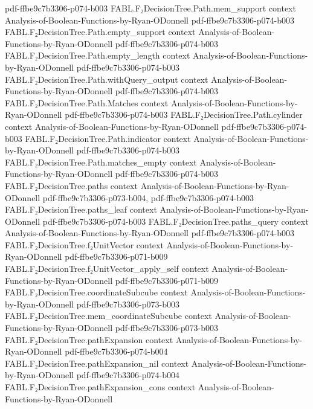 \begin{theorem}
  {pdf-ffbe9c7b3306-p074-b003}
\proofstep
  {FABL.F₂DecisionTree.Path.mem_support}
  {context}
  {Analysis-of-Boolean-Functions-by-Ryan-ODonnell}
  {pdf-ffbe9c7b3306-p074-b003}
\proofstep
  {FABL.F₂DecisionTree.Path.empty_support}
  {context}
  {Analysis-of-Boolean-Functions-by-Ryan-ODonnell}
  {pdf-ffbe9c7b3306-p074-b003}
\proofstep
  {FABL.F₂DecisionTree.Path.empty_length}
  {context}
  {Analysis-of-Boolean-Functions-by-Ryan-ODonnell}
  {pdf-ffbe9c7b3306-p074-b003}
\proofstep
  {FABL.F₂DecisionTree.Path.withQuery_output}
  {context}
  {Analysis-of-Boolean-Functions-by-Ryan-ODonnell}
  {pdf-ffbe9c7b3306-p074-b003}
\proofstep
  {FABL.F₂DecisionTree.Path.Matches}
  {context}
  {Analysis-of-Boolean-Functions-by-Ryan-ODonnell}
  {pdf-ffbe9c7b3306-p074-b003}
\proofstep
  {FABL.F₂DecisionTree.Path.cylinder}
  {context}
  {Analysis-of-Boolean-Functions-by-Ryan-ODonnell}
  {pdf-ffbe9c7b3306-p074-b003}
\proofstep
  {FABL.F₂DecisionTree.Path.indicator}
  {context}
  {Analysis-of-Boolean-Functions-by-Ryan-ODonnell}
  {pdf-ffbe9c7b3306-p074-b003}
\proofstep
  {FABL.F₂DecisionTree.Path.matches_empty}
  {context}
  {Analysis-of-Boolean-Functions-by-Ryan-ODonnell}
  {pdf-ffbe9c7b3306-p074-b003}
\proofstep
  {FABL.F₂DecisionTree.paths}
  {context}
  {Analysis-of-Boolean-Functions-by-Ryan-ODonnell}
  {pdf-ffbe9c7b3306-p073-b004,
    pdf-ffbe9c7b3306-p074-b003}
\proofstep
  {FABL.F₂DecisionTree.paths_leaf}
  {context}
  {Analysis-of-Boolean-Functions-by-Ryan-ODonnell}
  {pdf-ffbe9c7b3306-p074-b003}
\proofstep
  {FABL.F₂DecisionTree.paths_query}
  {context}
  {Analysis-of-Boolean-Functions-by-Ryan-ODonnell}
  {pdf-ffbe9c7b3306-p074-b003}
\proofstep
  {FABL.F₂DecisionTree.f₂UnitVector}
  {context}
  {Analysis-of-Boolean-Functions-by-Ryan-ODonnell}
  {pdf-ffbe9c7b3306-p071-b009}
\proofstep
  {FABL.F₂DecisionTree.f₂UnitVector_apply_self}
  {context}
  {Analysis-of-Boolean-Functions-by-Ryan-ODonnell}
  {pdf-ffbe9c7b3306-p071-b009}
\proofstep
  {FABL.F₂DecisionTree.coordinateSubcube}
  {context}
  {Analysis-of-Boolean-Functions-by-Ryan-ODonnell}
  {pdf-ffbe9c7b3306-p073-b003}
\proofstep
  {FABL.F₂DecisionTree.mem_coordinateSubcube}
  {context}
  {Analysis-of-Boolean-Functions-by-Ryan-ODonnell}
  {pdf-ffbe9c7b3306-p073-b003}
\proofstep
  {FABL.F₂DecisionTree.pathExpansion}
  {context}
  {Analysis-of-Boolean-Functions-by-Ryan-ODonnell}
  {pdf-ffbe9c7b3306-p074-b004}
\proofstep
  {FABL.F₂DecisionTree.pathExpansion_nil}
  {context}
  {Analysis-of-Boolean-Functions-by-Ryan-ODonnell}
  {pdf-ffbe9c7b3306-p074-b004}
\proofstep
  {FABL.F₂DecisionTree.pathExpansion_cons}
  {context}
  {Analysis-of-Boolean-Functions-by-Ryan-ODonnell}

\end{theorem}
